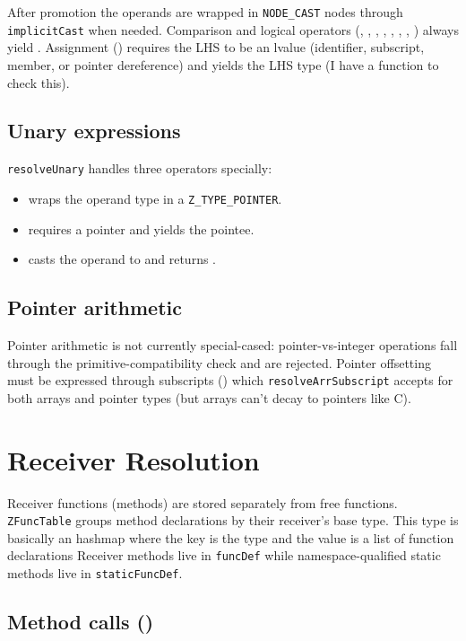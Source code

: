 After promotion the operands are wrapped in \texttt{NODE\_CAST} nodes
through \texttt{implicitCast} when needed. Comparison and logical
operators (\zn{==}, \zn{!=}, \zn{<}, \zn{>}, \zn{<=}, \zn{>=},
, ) always yield . Assignment (\zn{=}) requires
the LHS to be an lvalue (identifier, subscript, member, or pointer
dereference) and yields the LHS type (I have a function to check this).

\subsection{Unary expressions}

\texttt{resolveUnary} handles three operators specially:

\begin{itemize}
  \item {} wraps the operand type in a \texttt{Z\_TYPE\_POINTER}.
  \item {} requires a pointer and yields the pointee.
  \item {} casts the operand to  and returns .
\end{itemize}

\subsection{Pointer arithmetic}

Pointer arithmetic is not currently special-cased: pointer-vs-integer
operations fall through the primitive-compatibility check and are
rejected. Pointer offsetting must be expressed through subscripts
() which \texttt{resolveArrSubscript} accepts for both arrays
and pointer types (but arrays can't decay to pointers like C).

\section{Receiver Resolution}

Receiver functions (methods) are stored separately from free
functions. \texttt{ZFuncTable} groups method declarations by their
receiver's base type. This type is basically an hashmap where the key is the type and the value is a list of function declarations Receiver methods live in \texttt{funcDef} while
namespace-qualified static methods live in \texttt{staticFuncDef}.


\subsection{Method calls ()}

